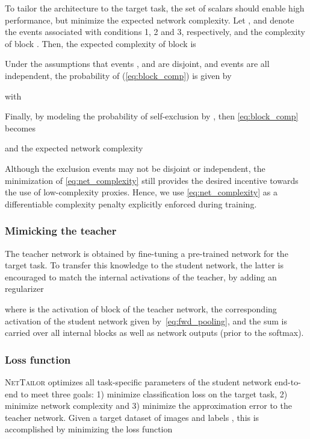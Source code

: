 \documentclass[10pt,twocolumn,letterpaper]{article}
\begin{document}
To tailor the architecture to the target task, the set of scalars  should enable high performance, but minimize the expected network complexity.
Let ,  and  denote the events associated with conditions 1, 2 and 3, respectively, and  the complexity of block . 
Then, the expected complexity of block  is

Under the assumptions that events ,  and  are disjoint, and events  are all independent, the probability of (\ref{eq:block_comp}) is given by

with



Finally, by modeling the probability of self-exclusion by , then \eqref{eq:block_comp} becomes

and the expected network complexity

Although the exclusion events may not be disjoint or independent, the minimization of \eqref{eq:net_complexity} still provides the desired incentive towards the use of low-complexity proxies. Hence, we use \eqref{eq:net_complexity} as a differentiable complexity penalty explicitly enforced during training.







\vspace{-10pt}
\subsubsection{Mimicking the teacher}
\vspace{-3pt}
\label{sec:proxy}

The teacher network is obtained by fine-tuning a pre-trained network for the target task.
To transfer this knowledge to the student network, the latter is encouraged to match the internal activations of the teacher, by adding an  regularizer

where  is the activation of  block of the teacher network,  the corresponding activation of the student network given by~\eqref{eq:fwd_pooling}, and the sum is carried over all internal blocks as well as network outputs (prior to the softmax).

\vspace{-10pt}
\subsubsection{Loss function}
\vspace{-3pt}
\textsc{NetTailor} optimizes all task-specific parameters of the student network end-to-end to meet three goals: 1) minimize classification loss on the target task, 2) minimize network complexity and 3) minimize the approximation error to the teacher network. 
Given a target dataset  of images  and labels , this is accomplished by minimizing the loss function 
\end{document}
